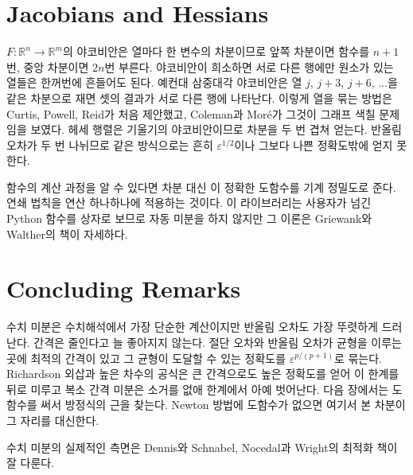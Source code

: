 \section{Jacobians and Hessians}
\label{sec:jacobian}

$F:\mathbb R^n\to\mathbb R^m$의 야코비안은 열마다 한 변수의 차분이므로 앞쪽 차분이면 함수를 $n+1$번, 중앙 차분이면 $2n$번 부른다. 야코비안이 희소하면 서로 다른 행에만 원소가 있는 열들은 한꺼번에 흔들어도 된다. 예컨대 삼중대각 야코비안은 열 $j$, $j+3$, $j+6$, $\dots$을 같은 차분으로 재면 셋의 결과가 서로 다른 행에 나타난다. 이렇게 열을 묶는 방법은 Curtis, Powell, Reid가 처음 제안했고\cite{curtis1974}, Coleman과 Moré가 그것이 그래프 색칠 문제임을 보였다\cite{coleman1983}. 헤세 행렬은 기울기의 야코비안이므로 차분을 두 번 겹쳐 얻는다. 반올림 오차가 두 번 나뉘므로 같은 방식으로는 흔히 $\varepsilon^{1/2}$이나 그보다 나쁜 정확도밖에 얻지 못한다.

함수의 계산 과정을 알 수 있다면 차분 대신 이 정확한 도함수를 기계 정밀도로 준다. 연쇄 법칙을 연산 하나하나에 적용하는 것이다. 이 라이브러리는 사용자가 넘긴 Python 함수를 상자로 보므로 자동 미분을 하지 않지만 그 이론은 Griewank와 Walther의 책\cite{griewank2008}이 자세하다.

\section{Concluding Remarks}

수치 미분은 수치해석에서 가장 단순한 계산이지만 반올림 오차도 가장 뚜렷하게 드러난다. 간격은 줄인다고 늘 좋아지지 않는다. 절단 오차와 반올림 오차가 균형을 이루는 곳에 최적의 간격이 있고 그 균형이 도달할 수 있는 정확도를 $\varepsilon^{p/(p+1)}$로 묶는다. Richardson 외삽과 높은 차수의 공식은 큰 간격으로도 높은 정확도를 얻어 이 한계를 뒤로 미루고 복소 간격 미분은 소거를 없애 한계에서 아예 벗어난다. 다음 장에서는 도함수를 써서 방정식의 근을 찾는다. Newton 방법에 도함수가 없으면 여기서 본 차분이 그 자리를 대신한다.

수치 미분의 실제적인 측면은 Dennis와 Schnabel\cite{dennis1996}, Nocedal과 Wright\cite{nocedal2006}의 최적화 책이 잘 다룬다.

\chapterreferences
